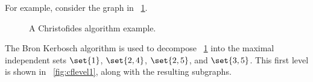 For example, consider the graph in \figurename~\ref{fig:cfexample}.

\begin{figure}[H]
  \centering
  \caption{A Christofides algorithm example.}
  \label{fig:cfexample}
\end{figure}

The Bron Kerbosch algorithm is used to decompose \figurename~\ref{fig:cfexample} into the maximal independent sets
\(\set{1}\), \(\set{2,4}\), \(\set{2,5}\), and \(\set{3,5}\).  This first level is shown in
\figurename~\ref{fig:cflevel1}, along with the resulting subgraphs.


